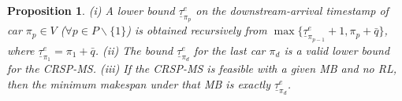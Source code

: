 \documentclass[12pt]{article}
\newtheorem{proposition}[theorem]{Proposition}
\begin{document}
\begin{itemize}
\end{itemize}

\begin{proposition}\label{pro3}
    \textup{(i)} A lower bound $\underline{\tau}^e_{\pi_p}$ on the downstream-arrival timestamp of car $\pi_p\in V$ ($\forall p\in P\backslash \{1\}$) is obtained recursively from $\max \{\underline{\tau}^e_{\pi_{p-1}}+1,\pi_p+\bar{q}\}$, where $\underline{\tau}^e_{\pi_1}=\pi_1+\bar{q}$. %
    \textup{(ii)} The bound $\underline{\tau}^e_{\pi_d}$ for the last car $\pi_d$ is a valid lower bound for the CRSP-MS. \textup{(iii)} If the CRSP-MS is feasible with a given MB and no RL, then the minimum makespan under that MB is exactly $\underline{\tau}^e_{\pi_d}$.
\end{proposition}

\end{document}

